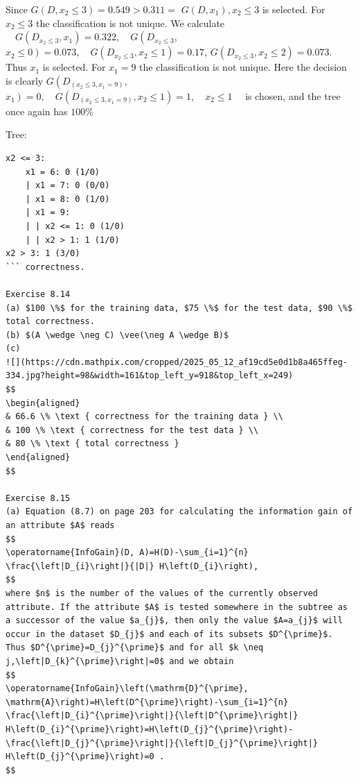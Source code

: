 \documentclass[10pt]{book}
\begin{document}
Since $G\left(D, x_{2} \leq 3\right)=0.549>0.311=$ $G\left(D, x_{1}\right), x_{2} \leq 3$ is selected. For $x_{2} \leq 3$ the classification is not unique. We calculate $\quad G\left(D_{x_{2} \leq 3}, x_{1}\right)=0.322, \quad G\left(D_{x_{2} \leq 3}\right.$, $\left.x_{2} \leq 0\right)=0.073, \quad G\left(D_{x_{2} \leq 3}, x_{2} \leq 1\right)=0.17$, $G\left(D_{x_{2} \leq 3}, x_{2} \leq 2\right)=0.073$. Thus $x_{1}$ is selected. For $x_{1}=9$ the classification is not unique. Here the decision is clearly $G\left(D_{\left(x_{2} \leq 3, x_{1}=9\right)}\right.$, $\left.x_{1}\right)=0, \quad G\left(D_{\left(x_{2} \leq 3, x_{1}=9\right)}, x_{2} \leq 1\right)=1, \quad x_{2} \leq 1 \quad$ is chosen, and the tree once again has $100 \%$

Tree:

\begin{verbatim}
x2 <= 3:
    x1 = 6: 0 (1/0)
    | x1 = 7: 0 (0/0)
    | x1 = 8: 0 (1/0)
    | x1 = 9:
    | | x2 <= 1: 0 (1/0)
    | | x2 > 1: 1 (1/0)
x2 > 3: 1 (3/0)
``` correctness.

Exercise 8.14
(a) $100 \%$ for the training data, $75 \%$ for the test data, $90 \%$ total correctness.
(b) $(A \wedge \neg C) \vee(\neg A \wedge B)$
(c)
![](https://cdn.mathpix.com/cropped/2025_05_12_af19cd5e0d1b8a465ffeg-334.jpg?height=98&width=161&top_left_y=918&top_left_x=249)
$$
\begin{aligned}
& 66.6 \% \text { correctness for the training data } \\
& 100 \% \text { correctness for the test data } \\
& 80 \% \text { total correctness }
\end{aligned}
$$

Exercise 8.15
(a) Equation (8.7) on page 203 for calculating the information gain of an attribute $A$ reads
$$
\operatorname{InfoGain}(D, A)=H(D)-\sum_{i=1}^{n} \frac{\left|D_{i}\right|}{|D|} H\left(D_{i}\right),
$$
where $n$ is the number of the values of the currently observed attribute. If the attribute $A$ is tested somewhere in the subtree as a successor of the value $a_{j}$, then only the value $A=a_{j}$ will occur in the dataset $D_{j}$ and each of its subsets $D^{\prime}$. Thus $D^{\prime}=D_{j}^{\prime}$ and for all $k \neq j,\left|D_{k}^{\prime}\right|=0$ and we obtain
$$
\operatorname{InfoGain}\left(\mathrm{D}^{\prime}, \mathrm{A}\right)=H\left(D^{\prime}\right)-\sum_{i=1}^{n} \frac{\left|D_{i}^{\prime}\right|}{\left|D^{\prime}\right|} H\left(D_{i}^{\prime}\right)=H\left(D_{j}^{\prime}\right)-\frac{\left|D_{j}^{\prime}\right|}{\left|D_{j}^{\prime}\right|} H\left(D_{j}^{\prime}\right)=0 .
$$


\end{verbatim}
\end{document}
